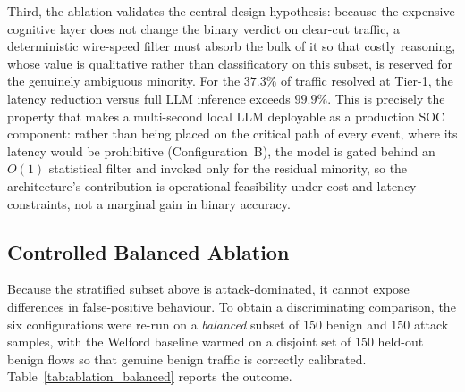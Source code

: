 Third, the ablation validates the central design hypothesis: because the expensive cognitive layer does not change the binary verdict on clear-cut traffic, a deterministic wire-speed filter must absorb the bulk of it so that costly reasoning, whose value is qualitative rather than classificatory on this subset, is reserved for the genuinely ambiguous minority. For the $37.3\%$ of traffic resolved at Tier-1, the latency reduction versus full LLM inference exceeds $99.9\%$. This is precisely the property that makes a multi-second local LLM deployable as a production SOC component: rather than being placed on the critical path of every event, where its latency would be prohibitive (Configuration~B), the model is gated behind an $O(1)$ statistical filter and invoked only for the residual minority, so the architecture's contribution is operational feasibility under cost and latency constraints, not a marginal gain in binary accuracy.

\subsection{Controlled Balanced Ablation}
Because the stratified subset above is attack-dominated, it cannot expose differences in false-positive behaviour. To obtain a discriminating comparison, the six configurations were re-run on a \emph{balanced} subset of $150$ benign and $150$ attack samples, with the Welford baseline warmed on a disjoint set of $150$ held-out benign flows so that genuine benign traffic is correctly calibrated. Table~\ref{tab:ablation_balanced} reports the outcome.

